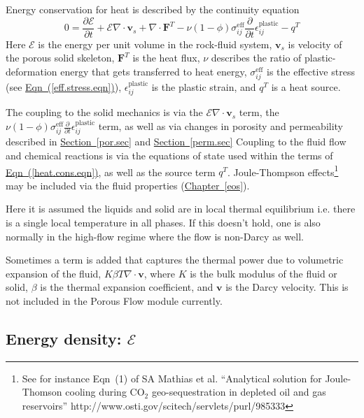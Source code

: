 \documentclass[12pt]{report}
\def\flux{\mathbf{F}}
\def\darcyvel{\mathbf{v}}
\def\energydens{\mathcal{E}}
\begin{document}
Energy conservation for heat is described by the continuity
equation
\begin{equation}
0 = \frac{\partial\energydens}{\partial t} + \energydens\nabla\cdot{\mathbf
  v}_{s} + \nabla\cdot \flux^{T} -
\nu
  (1-\phi)\sigma^{\mathrm{eff}}_{ij}\frac{\partial}{\partial
    t}\epsilon_{ij}^{\mathrm{plastic}}
 - q^{T}
\label{heat.cons.eqn}
\end{equation}
Here $\energydens$ is the energy per unit volume in the rock-fluid
system, ${\mathbf v}_{s}$ is velocity of the porous solid skeleton,
$\flux^{T}$ is the heat flux, $\nu$ describes the ratio of
plastic-deformation energy that gets transferred to heat energy,
$\sigma^{\mathrm{eff}}_{ij}$ is the effective stress (see
\hyperref[eff.stress.eqn]{Eqn~(\ref*{eff.stress.eqn})}),
$\epsilon_{ij}^{\mathrm{plastic}}$ is the plastic strain, and $q^{T}$
is a heat source.

The coupling to the solid mechanics is via the
$\energydens\nabla\cdot{\mathbf v}_{s}$ term, the $\nu
(1-\phi)\sigma^{\mathrm{eff}}_{ij}\frac{\partial}{\partial
  t}\epsilon_{ij}^{\mathrm{plastic}}$ term, as well as via changes in
porosity and permeability described in
\hyperref[por.sec]{Section~\ref*{por.sec}} and
\hyperref[perm.sec]{Section~\ref*{perm.sec}} Coupling to the fluid
flow and chemical reactions is via the equations of state used within
the terms of \hyperref[heat.cons.eqn]{Eqn~(\ref*{heat.cons.eqn})}, as
well as the source term $q^{T}$.  Joule-Thompson effects\footnote{See
  for instance Eqn~(1) of SA Mathias et al. ``Analytical solution for
  Joule-Thomson cooling during CO$_{2}$ geo-sequestration in depleted
  oil and gas reservoirs''
  http://www.osti.gov/scitech/servlets/purl/985333} may be included
via the fluid properties (\hyperref[eos]{Chapter~\ref*{eos}}).

Here it is assumed the liquids and
solid are in local thermal equilibrium i.e. there is a single local
temperature in all phases.   If this doesn't hold, one is also normally in the
  high-flow regime where the flow is non-Darcy as well.

Sometimes a term is added that captures the thermal power due to
volumetric expansion of the fluid, $K\beta T\nabla\cdot\darcyvel$,
where $K$ is the bulk modulus of the fluid or solid, $\beta$ is the
thermal expansion coefficient, and $\darcyvel$ is the Darcy
velocity. This is not included in the Porous Flow module currently.

\subsection{Energy density: $\energydens$}
\end{document}
